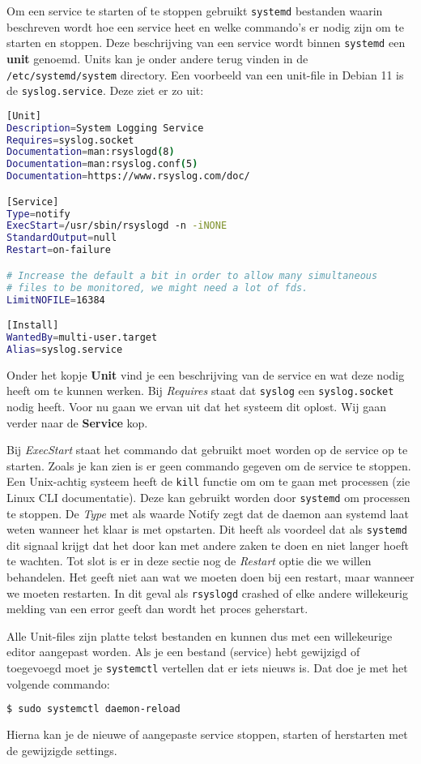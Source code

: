 Om een service te starten of te stoppen gebruikt \texttt{systemd} bestanden waarin beschreven wordt hoe een service heet en welke commando's er nodig zijn om te starten en stoppen. Deze beschrijving van een service wordt binnen \texttt{systemd} een \textbf{unit} genoemd. Units kan je onder andere terug vinden in de \texttt{/etc/systemd/system} directory. Een voorbeeld van een unit-file in Debian 11 is de \texttt{syslog.service}. Deze ziet er zo uit:

\begin{lstlisting}[language=bash]
[Unit]
Description=System Logging Service
Requires=syslog.socket
Documentation=man:rsyslogd(8)
Documentation=man:rsyslog.conf(5)
Documentation=https://www.rsyslog.com/doc/

[Service]
Type=notify
ExecStart=/usr/sbin/rsyslogd -n -iNONE
StandardOutput=null
Restart=on-failure

# Increase the default a bit in order to allow many simultaneous
# files to be monitored, we might need a lot of fds.
LimitNOFILE=16384

[Install]
WantedBy=multi-user.target
Alias=syslog.service
\end{lstlisting}

Onder het kopje \textbf{Unit} vind je een beschrijving van de service en wat deze nodig heeft om te kunnen werken. Bij \textit{Requires} staat dat \texttt{syslog} een \texttt{syslog.socket} nodig heeft. Voor nu gaan we ervan uit dat het systeem dit oplost. Wij gaan verder naar de \textbf{Service} kop.

Bij \textit{ExecStart} staat het commando dat gebruikt moet worden op de service op te starten. Zoals je kan zien is er geen commando gegeven om de service te stoppen. Een Unix-achtig systeem heeft de \texttt{kill} functie om om te gaan met processen (zie Linux CLI documentatie). Deze kan gebruikt worden door \texttt{systemd} om processen te stoppen. De \textit{Type} met als waarde Notify zegt dat de daemon aan systemd laat weten wanneer het klaar is met opstarten. Dit heeft als voordeel dat als \texttt{systemd} dit signaal krijgt dat het door kan met andere zaken te doen en niet langer hoeft te wachten. Tot slot is er in deze sectie nog de \textit{Restart} optie die we willen behandelen. Het geeft niet aan wat we moeten doen bij een restart, maar wanneer we moeten restarten. In dit geval als \texttt{rsyslogd} crashed of elke andere willekeurig melding van een error geeft dan wordt het proces geherstart.

Alle Unit-files zijn platte tekst bestanden en kunnen dus met een willekeurige editor aangepast worden. Als je een bestand (service) hebt gewijzigd of toegevoegd moet je \texttt{systemctl} vertellen dat er iets nieuws is. Dat doe je met het volgende commando:
\begin{lstlisting}[language=bash]
$ sudo systemctl daemon-reload
\end{lstlisting}
Hierna kan je de nieuwe of aangepaste service stoppen, starten of herstarten met de gewijzigde settings.

